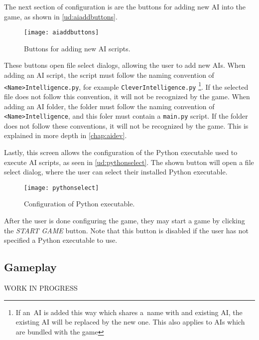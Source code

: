 The next section of configuration is are the buttons for adding new AI
into the game, as shown in \autoref{ud:aiaddbuttons}.

\begin{figure}[ht]
\centerline{\mbox{\texttt{[image: aiaddbuttons]}}}
\caption{Buttons for adding new AI scripts.}\label{ud:aiaddbuttons}
\end{figure}

These buttons open file select dialogs, allowing the user to add new AIs.
When adding an AI script, the script must follow the naming convention
of \texttt{<Name>Intelligence.py}, for example \texttt{CleverIntelligence.py}
\footnote{If an~AI is added this way which shares a~name with and existing AI,
the existing AI will be replaced by the new one. This also applies to AIs which
are bundled with the game}.
If the selected file does not follow this convention, it will not be recognized
by the game.
When adding an AI folder, the folder must follow the naming convention of
\texttt{<Name>Intelligence}, and this foler must contain a \texttt{main.py}
script. If the folder does not follow these conventions, it will not be recognized
by the game. This is explained in more depth in \autoref{chap:aidev}.

Lastly, this screen allows the configuration of the Python executable used
to execute AI scripts, as seen in \autoref{ud:pythonselect}. The shown
button will open a file select dialog, where the user can select their
installed Python executable.

\begin{figure}[ht]
\centerline{\mbox{\texttt{[image: pythonselect]}}}
\caption{Configuration of Python executable.}\label{ud:pythonselect}
\end{figure}

After the user is done configuring the game, they may start a game by clicking the
\emph{START GAME} button. Note that this button is disabled if the user
has not specified a Python executable to use.

\subsection{Gameplay}

WORK IN PROGRESS
